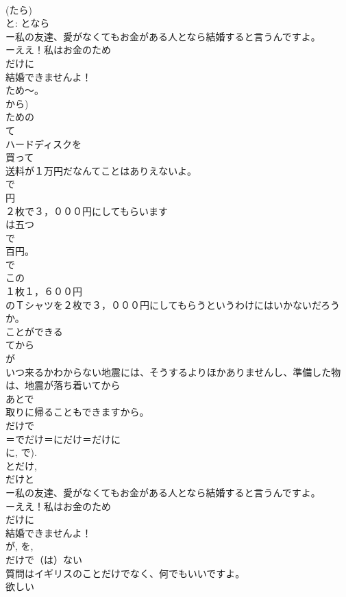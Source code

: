 \documentclass[8pt]{extreport}
\begin{document}
\begin{CJK}{UTF8}{min}
\\	(たら) 
\\	と: となら
\\	ー私の友達、愛がなくてもお金がある人となら結婚すると言うんですよ。
\\	ーええ！私はお金のため
\\	だけに
\\	結婚できませんよ！	
\\	ため～。
\\	から) 
\\	ための 
\\	て
\\	ハードディスクを
\\	買って
\\	送料が１万円だなんてことはありえないよ。
\\	で
\\	円
\\	２枚で３，０００円にしてもらいます
\\	は五つ
\\	で
\\	百円。
\\	で 
\\	この
\\	１枚１，６００円
\\	のＴシャツを２枚で３，０００円にしてもらうというわけにはいかないだろうか。
\\	ことができる
\\	てから
\\	が 
\\	いつ来るかわからない地震には、そうするよりほかありませんし、準備した物は、地震が落ち着いてから
\\	あとで
\\	取りに帰ることもできますから。	
\\	だけで
\\	＝でだけ＝にだけ＝だけに
\\	に, で).
\\	とだけ, 
\\	だけと
\\	ー私の友達、愛がなくてもお金がある人となら結婚すると言うんですよ。
\\	ーええ！私はお金のため
\\	だけに
\\	結婚できませんよ！
\\	が, を, 
\\	だけで（は）ない
\\	質問はイギリスのことだけでなく、何でもいいですよ。
\\	欲しい

\end{CJK}
\end{document}
